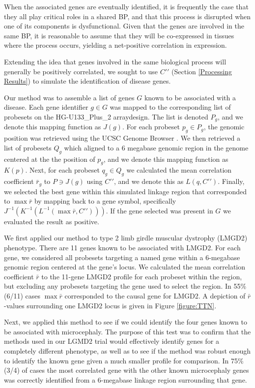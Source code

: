 \documentclass{bioinfo}
\begin{document}
When the associated genes are eventually identified, it is frequently the case
that they all play critical roles in a shared BP, and that this process is
disrupted when one of its components is dysfunctional.  Given that the genes
are involved in the same BP, it is reasonable to assume that they will be
co-expressed in tissues where the process occurs, yielding a net-positive
correlation in expression.

Extending the idea that genes involved in the same biological process will
generally be positively correlated, we sought to use $C\prime\prime$ (Section
\ref{Processing Results}) to simulate the identification of disease genes.

Our method was to assemble a list of genes $G$ known to be associated with a
disease.  Each gene identifier $g \in G$ was mapped to the corresponding list
of probesets on the HG-U133\_Plus\_2 arraydesign.  The list is denoted $P_g$,
and we denote this mapping function as $J(g)$.  For each probeset $p_g \in
P_g$, the genomic position was retrieved using the UCSC Genome Browser
\cite{karolchik}.  We then retrieved a list of probesets $Q_g$ which aligned to
a 6 megabase genomic region in the genome centered at the the position of
$p_g$, and we denote this mapping function as $K(p)$.  Next, for each probeset
$q_g \in Q_g$ we calculated the mean correlation coefficient $\bar{r}_g$ to $P
\ni J(g)$ using $C\prime\prime$, and we denote this as $L(q,C\prime\prime)$.
Finally, we selected the best gene within this simulated linkage region that
corresponded to $\max{\bar{r}}$ by mapping back to a gene symbol, specifically
$J^{-1}(K^{-1}(L^{-1}(\max{\bar{r}},C\prime\prime)))$.  If the gene selected
was present in $G$ we evaluated the result as positive.

We first applied our method to type 2 limb girdle muscular dystrophy (LMGD2)
phenotype.  There are 11 genes known to be associated with LMGD2.  For each
gene, we considered all probesets targeting a named gene within a 6-megabase
genomic region centered at the gene's locus.  We calculated the mean
correlation coefficient $\bar{r}$ to the 11-gene LMGD2 profile for each
probeset within the region, but excluding any probesets targeting the gene used
to select the region.  In 55\% (6/11) cases $\max{\bar{r}}$ corresponded to the
causal gene for LMGD2.  A depiction of $\bar{r}$-values surrounding one LMGD2
locus is given in Figure \ref{figure:TTN}.

Next, we applied this method to see if we could identify the four genes known
to be associated with microcephaly.  The purpose of this test was to confirm
that the methods used in our LGMD2 trial would effectively identify genes for a
completely different phenotype, as well as to see if the method was robust
enough to identify the known gene given a much smaller profile for comparison.
In 75\% (3/4) of cases the most correlated gene with the other known
microcephaly genes was correctly identified from a 6-megabase linkage region
surrounding that gene.
\end{document}
